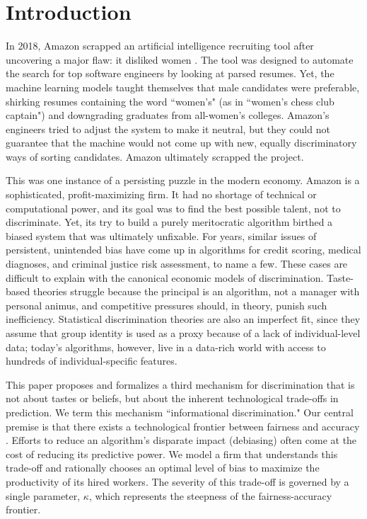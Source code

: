 \section{Introduction}

In 2018, Amazon scrapped an artificial intelligence recruiting tool after uncovering a major flaw: it disliked women \citep{Dastin2018}. The tool was designed to automate the search for top software engineers by looking at parsed resumes. Yet, the machine learning models taught themselves that male candidates were preferable, shirking resumes containing the word ``women's" (as in ``women's chess club captain") and downgrading graduates from all-women's colleges. Amazon's engineers tried to adjust the system to make it neutral, but they could not guarantee that the machine would not come up with new, equally discriminatory ways of sorting candidates. Amazon ultimately scrapped the project.

This was one instance of a persisting puzzle in the modern economy. Amazon is a sophisticated, profit-maximizing firm. It had no shortage of technical or computational power, and its goal was to find the best possible talent, not to discriminate. Yet, its try to build a purely meritocratic algorithm birthed a biased system that was ultimately unfixable. For years, similar issues of persistent, unintended bias have come up in algorithms for credit scoring, medical diagnoses, and criminal justice risk assessment, to name a few. These cases are difficult to explain with the canonical economic models of discrimination. Taste-based theories \citep{Becker1957} struggle because the principal is an algorithm, not a manager with personal animus, and competitive pressures should, in theory, punish such inefficiency. Statistical discrimination theories \citep{Phelps1972, Arrow1973} are also an imperfect fit, since they assume that group identity is used as a proxy because of a lack of individual-level data; today's algorithms, however, live in a data-rich world with access to hundreds of individual-specific features.

This paper proposes and formalizes a third mechanism for discrimination that is not about tastes or beliefs, but about the inherent technological trade-offs in prediction. We term this mechanism ``informational discrimination." Our central premise is that there exists a technological frontier between fairness and accuracy \citep{Kleinberg2017, Chouldechova2017}. Efforts to reduce an algorithm's disparate impact (debiasing) often come at the cost of reducing its predictive power. We model a firm that understands this trade-off and rationally chooses an optimal level of bias to maximize the productivity of its hired workers. The severity of this trade-off is governed by a single parameter, $\kappa$, which represents the steepness of the fairness-accuracy frontier.

